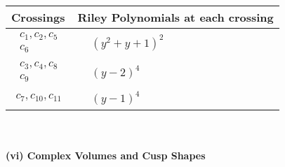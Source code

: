 \documentclass[1p]{elsarticle_modified}
\theoremstyle{definition}
\begin{document}
\begin{tabular}{m{50pt}|m{274pt}}
Crossings & \hspace{64pt}Riley Polynomials at each crossing \\
\hline $$\begin{aligned}c_{1},c_{2},c_{5}\\c_{6}\end{aligned}$$&$\begin{aligned}
&(y^2+y+1)^2
\end{aligned}$\\
\hline $$\begin{aligned}c_{3},c_{4},c_{8}\\c_{9}\end{aligned}$$&$\begin{aligned}
&(y-2)^4
\end{aligned}$\\
\hline $$\begin{aligned}c_{7},c_{10},c_{11}\end{aligned}$$&$\begin{aligned}
&(y-1)^4
\end{aligned}$\\
\hline
\end{tabular}\\~\\
\newpage\flushleft \textbf{(vi) Complex Volumes and Cusp Shapes}
\end{document}
